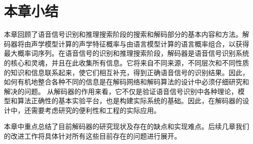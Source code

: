 \section{本章小结}
\label{chap:intro2-sum}


本章回顾了语音信号识别和推理搜索阶段的搜索和解码部分的基本内容和方法。解码器将由声学模型计算的声学特征概率与由语言模型计算的语言概率组合，以获得最大概率词序列。在语音信号的识别和推理搜索阶段，解码器是语音信号识别系统的核心和灵魂，并且在此收集所有信息。它将来自不同来源，不同层次和不同性质的知识和信息联系起来，使它们相互补充，得到正确语音信号的识别结果。因此，如何有机地整合各种不同的信息是在解码网络和解码算法的设计中必须仔细研究和解决的问题。
从解码器的作用来看，它不仅是验证语音信号识别中各种理论，模型和算法正确性的基本实验平台，也是构建实际系统的基础。因此，在解码器的设计中，还需要考虑研究的便利性和工程的实际应用。

本章中重点总结了目前解码器的研究现状及存在的缺点和实现难点。后续几章我们的改进工作将具体针对所有这些目前存在的问题进行展开。
